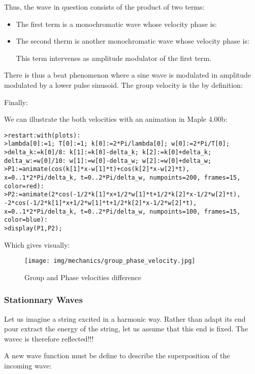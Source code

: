 	Thus, the wave in question consists of the product of two terms:
	\begin{itemize}
		\item The first term is a monochromatic wave whose velocity phase is:
		
	
		\item The second therm is another monochromatic wave whose velocity phase is:
		
		This term intervenes as amplitude modulator of the first term.
	\end{itemize}
	There is thus a beat phenomenon where a sine wave is modulated in amplitude modulated by a lower pulse sinusoid. The group velocity is the by definition:
		
		Finally:
		
		We can illustrate the both velocities with an animation in Maple 4.00b:
		
		\texttt{>restart:with(plots):\\
		>lambda[0]:=1; T[0]:=1; k[0]:=2*Pi/lambda[0]; w[0]:=2*Pi/T[0];\\
		>delta\_k:=k[0]/8: k[1]:=k[0]-delta\_k; k[2]:=k[0]+delta\_k;
	delta\_w:=w[0]/10: w[1]:=w[0]-delta\_w; w[2]:=w[0]+delta\_w;\\
		>P1:=animate(cos(k[1]*x-w[1]*t)+cos(k[2]*x-w[2]*t), x=0..1*2*Pi/delta\_k, t=0..2*Pi/delta\_w, numpoints=200, frames=15, color=red):\\
		>P2:=animate({2*cos(-1/2*k[1]*x+1/2*w[1]*t+1/2*k[2]*x-1/2*w[2]*t), -2*cos(-1/2*k[1]*x+1/2*w[1]*t+1/2*k[2]*x-1/2*w[2]*t)}, x=0..1*2*Pi/delta\_k, t=0..2*Pi/delta\_w, numpoints=100, frames=15, color=blue):\\
		>display(P1,P2);}
		
		Which gives visually:
		\begin{figure}[H]
			\centering
			\texttt{[image: img/mechanics/group\_phase\_velocity.jpg]}
			\caption{Group and Phase velocities difference}
		\end{figure}
	
	\subsubsection{Stationnary Waves}
	Let us imagine a string excited in a harmonic way. Rather than adapt its end pour extract the energy of the string, let us assume that this end is fixed. The wavec is therefore reflected!!!
	
	A new wave function must be define to describe the superposition of the incoming wave:
	
